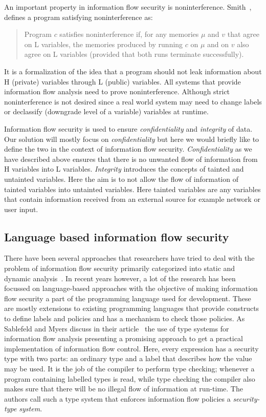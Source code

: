 An important property in information flow security is noninterference. Smith~\cite{PrincInfoSec},
defines a program satisfying noninterference as: \begin{quotation}
	\noindent Program $c$ satisfies noninterference if, for
	any memories $\mu$ and $v$ that agree on L variables, the memories produced by
	running $c$ on $\mu$ and on $v$ also agree on L variables (provided that both runs
	terminate successfully).
\end{quotation} It is a formalization of the idea that a program should not leak
information about H (private) variables through L (public) variables. All systems
that provide information flow analysis need to prove noninterference. Although
strict noninterference is not desired since a real world system may need to change
labels or declassify (downgrade level of a variable) variables at runtime.

Information flow security is used to ensure \textit{confidentiality} and \textit{integrity}
of data. Our solution will mostly focus on \textit{confidentiality} but here we would
briefly like to define the two in the context of information flow security. \textit{Confidentiality}
as we have described above ensures that there is no unwanted flow of information
from H variables into L variables. \textit{Integrity} introduces the concepts of
tainted and untainted variables. Here the aim is to not allow the flow of information
of tainted variables into untainted variables. Here tainted variables are any
variables that contain information received from an external source for example
network or user input.

\subsection{Language based information flow security \label{subsec:langinfo}}
There have been several approaches that researchers have tried to deal with the
problem of information flow security primarily categorized into static and dynamic
analysis~\cite{Russo, Chlipala}. In recent years however, a lot of the research has
been focussed on language-based approaches with the objective of making information
flow security a part of the programming language used for development. These are
mostly extensions to existing programming languages that provide constructs to define
labels and policies and has a mechanism to check those policies. As Sablefeld and
Myers discuss in their article~\cite{LangInfo} the use of type systems for information
flow analysis presenting a promising approach to get a practical implementation of
information flow control. Here, every expression has a security type with two parts:
an ordinary type and a label that describes how the value may be used. It is the
job of the compiler to perform type checking; whenever a program containing labelled
types is read, while type checking the compiler also makes sure that there will
be no illegal flow of information at run-time. The authors call such a type system
that enforces information flow policies a \textit{security-type system}.

